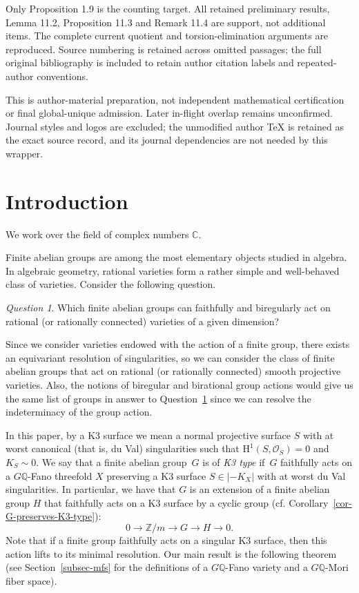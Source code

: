 \documentclass[10pt,a4paper]{article}
\theoremstyle{definition}
\theoremstyle{remark}
\newtheorem{question}[thm]{Question}
\newcommand{\OOO}{\mathscr{O}}
\newcommand{\lra}{\longrightarrow}
\begin{document}
\par\smallskip
\noindent Only Proposition 1.9 is the counting target. All retained preliminary results, Lemma 11.2, Proposition 11.3 and Remark 11.4 are support, not additional items. The complete current quotient and torsion-elimination arguments are reproduced. Source numbering is retained across omitted passages; the full original bibliography is included to retain author citation labels and repeated-author conventions.
\par\smallskip
\noindent This is author-material preparation, not independent mathematical certification or final global-unique admission. Later in-flight overlap remains unconfirmed. Journal styles and logos are excluded; the unmodified author TeX is retained as the exact source record, and its journal dependencies are not needed by this wrapper.
\par\medskip

\section{Introduction}
We work over the field of complex numbers $\mathbb{C}$. 

Finite abelian groups are among the most elementary objects studied in algebra. In algebraic geometry, rational varieties form a rather simple and well-behaved class of varieties. Consider the following question. 

\begin{question}
\label{main-question}
Which finite abelian groups can faithfully and biregularly act on rational (or rationally connected) varieties of a given dimension? 
\end{question}

Since we consider varieties endowed with the action of a finite group, there exists an equivariant resolution of singularities, so we can consider the class of finite abelian groups that act on rational (or rationally connected) smooth projective varieties. Also,  the notions of biregular and birational group actions would give us the same list of groups in answer to Question~\ref{main-question} since we can resolve the indeterminacy of the group action.

In this paper, by a K3 surface we mean a normal projective surface $S$ with at worst canonical (that is, du Val) singularities such that $\mathrm{H}^1(S, \OOO_S)=0$ and $K_S\sim 0$.  We say that a finite abelian group~$G$ is of \emph{K3 type} if~$G$ faithfully acts on a $G\mathbb{Q}$-Fano threefold $X$ preserving a K3 surface $S\in|-K_X|$ with at worst du Val singularities. In particular, we have that $G$ is an extension of a finite abelian group $H$ that faithfully acts on a K3 surface by a cyclic group (cf. Corollary~\ref{cor-G-preserves-K3-type}):
\[
0\lra \mathbb{Z}/m\lra G \lra H\lra 0.
\]
Note that if a finite group faithfully acts on a singular K3 surface, then this action lifts to its minimal resolution.  Our main result is the following theorem (see Section~\ref{subsec-mfs} for the definitions of a $G\mathbb{Q}$-Fano variety and a $G\mathbb{Q}$-Mori fiber space).
\end{document}
